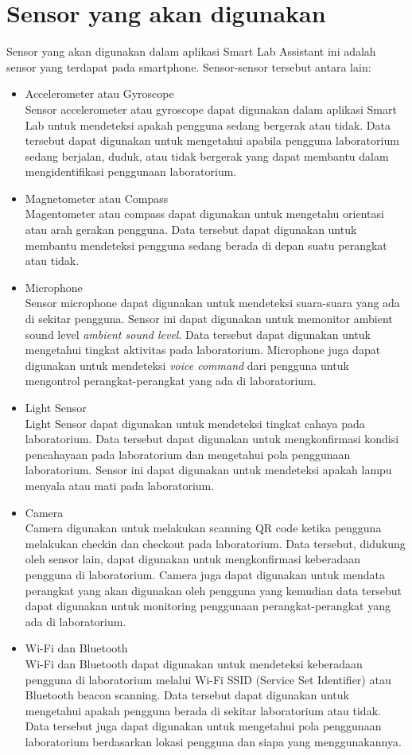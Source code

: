 \documentclass{ugm-report}
\begin{document}
\section{Sensor yang akan digunakan}
Sensor yang akan digunakan dalam aplikasi Smart Lab Assistant ini adalah sensor yang terdapat pada smartphone. Sensor-sensor tersebut antara lain:
\begin{itemize}
	\item Accelerometer atau Gyroscope\\
	      Sensor accelerometer atau gyroscope dapat digunakan dalam aplikasi Smart Lab untuk mendeteksi apakah pengguna sedang bergerak atau tidak.
	      Data tersebut dapat digunakan untuk mengetahui apabila pengguna laboratorium sedang berjalan, duduk, atau tidak bergerak yang dapat membantu dalam mengidentifikasi penggunaan laboratorium.
	\item Magnetometer atau Compass\\
	      Magentometer atau compass dapat digunakan untuk mengetahu orientasi atau arah gerakan pengguna.
	      Data tersebut dapat digunakan untuk membantu mendeteksi pengguna sedang berada di depan suatu perangkat atau tidak.
	\item Microphone\\
	      Sensor microphone dapat digunakan untuk mendeteksi suara-suara yang ada di sekitar pengguna. Sensor ini dapat digunakan untuk memonitor ambient sound level \textit{ambient sound level}. Data tersebut dapat digunakan untuk mengetahui tingkat aktivitas pada laboratorium. Microphone juga dapat digunakan untuk mendeteksi \textit{voice command} dari pengguna untuk mengontrol perangkat-perangkat yang ada di laboratorium.
	\item Light Sensor\\
	      Light Sensor dapat digunakan untuk mendeteksi tingkat cahaya pada laboratorium. Data tersebut dapat digunakan untuk mengkonfirmasi kondisi pencahayaan pada laboratorium dan mengetahui pola penggunaan laboratorium. Sensor ini dapat digunakan untuk mendeteksi apakah lampu menyala atau mati pada laboratorium.
	\item Camera\\
	      Camera digunakan untuk melakukan scanning QR code ketika pengguna melakukan checkin dan checkout pada laboratorium. Data tersebut, didukung oleh sensor lain, dapat digunakan untuk mengkonfirmasi keberadaan pengguna di laboratorium. Camera juga dapat digunakan untuk mendata perangkat yang akan digunakan oleh pengguna yang kemudian data tersebut dapat digunakan untuk monitoring penggunaan perangkat-perangkat yang ada di laboratorium.
	\item Wi-Fi dan Bluetooth\\
	      Wi-Fi dan Bluetooth dapat digunakan untuk mendeteksi keberadaan pengguna di laboratorium melalui Wi-Fi SSID (Service Set Identifier) atau Bluetooth beacon scanning. Data tersebut dapat digunakan untuk mengetahui apakah pengguna berada di sekitar laboratorium atau tidak. Data tersebut juga dapat digunakan untuk mengetahui pola penggunaan laboratorium berdasarkan lokasi pengguna dan siapa yang menggunakannya.
\end{itemize}
\end{document}
